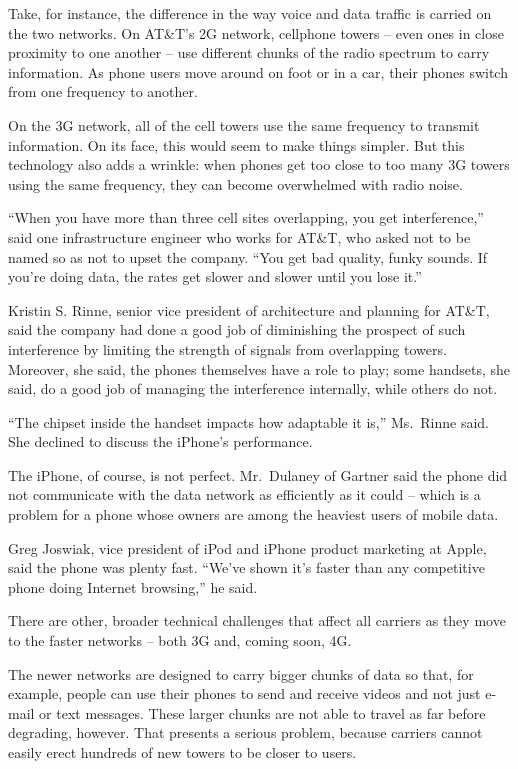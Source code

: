 \documentclass[12pt,a4paper,onecolumn]{article}
\begin{document}
\begin{CJK*}{GBK}{song}
Take, for instance, the difference in the way voice and data traffic is carried on the two networks.
On AT\&T's 2G network, cellphone towers -- even ones in close proximity to one another -- use
different chunks of the radio spectrum to carry information. As phone users move around on foot or
in a car, their phones switch from one frequency to another.

On the 3G network, all of the cell towers use the same frequency to transmit information. On its
face, this would seem to make things simpler. But this technology also adds a wrinkle: when phones
get too close to too many 3G towers using the same frequency, they can become overwhelmed with radio
noise.

``When you have more than three cell sites overlapping, you get interference,'' said one
infrastructure engineer who works for AT\&T, who asked not to be named so as not to upset the
company. ``You get bad quality, funky sounds. If you're doing data, the rates get slower and slower
until you lose it.''

Kristin S. Rinne, senior vice president of architecture and planning for AT\&T, said the company had
done a good job of diminishing the prospect of such interference by limiting the strength of signals
from overlapping towers. Moreover, she said, the phones themselves have a role to play; some
handsets, she said, do a good job of managing the interference internally, while others do not.

``The chipset inside the handset impacts how adaptable it is,'' Ms.~Rinne said. She declined to
discuss the iPhone's performance.

The iPhone, of course, is not perfect. Mr.~Dulaney of Gartner said the phone did not communicate
with the data network as efficiently as it could -- which is a problem for a phone whose owners are
among the heaviest users of mobile data.

Greg Joswiak, vice president of iPod and iPhone product marketing at Apple, said the phone was
plenty fast. ``We've shown it's faster than any competitive phone doing Internet browsing,'' he
said.

There are other, broader technical challenges that affect all carriers as they move to the faster
networks -- both 3G and, coming soon, 4G.

The newer networks are designed to carry bigger chunks of data so that, for example, people can use
their phones to send and receive videos and not just e-mail or text messages. These larger chunks
are not able to travel as far before degrading, however. That presents a serious problem, because
carriers cannot easily erect hundreds of new towers to be closer to users.


\end{CJK*}
\end{document}
